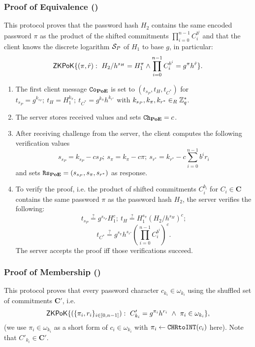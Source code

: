 \subsubsection{Proof of Equivalence (\PoE)}
This protocol proves that the password hash $H_2$ contains the same encoded password $\pi$ as the product of the shifted commitments $\prod_{i=0}^{n-1} C^{b^i}_i$ and that the client knows the discrete logarithm $\mathcal{S}_P$ of $H_1$ to base $g$, in particular:
\[
  \mathsf{ZKPoK}\{(\pi,\hat{r}) : ~ H_2/h^{s_H}=H_1^{\pi} \wedge \prod_{i=0}^{n-1} C_i^{b^i} = g^{\pi}h^{\hat{r}}\}.
\]
\begin{enumerate}
  \item The first client message $\mathtt{Co}_\mathsf{\bf PoE}$ is set to $(t_{s_P}, t_H, t_{C^\ast})$ for
    $t_{s_P}=g^{k_{s_P}};~ t_H=H_1^{k_{\pi}};~ t_{C^\ast}=g^{k_{\pi}}h^{k_{r^{\ast}}}$
    with 
    $k_{s_P},k_{\pi},k_{r^\ast}\in_R\mathbb{Z}^\ast_q$.
    
  \item The server stores received values and sets $\mathtt{Ch}_\mathsf{\bf PoE}=c$. 
  
  \item After receiving challenge \Client from the server, the client computes the following verification values
    \[
      s_{s_P}=k_{s_P}-c s_P;~ s_{\pi}=k_\pi - c \pi;~ s_{r^\ast}=k_{r^\ast} - c \sum_{i=0}^{n-1} b^i r_i
    \]
    and sets $\mathtt{Rs}_\mathsf{\bf PoE}=(s_{s_P}, s_\pi, s_{r^\ast})$ as response.
  
  \item To verify the proof, i.e. the product of shifted commitments $C_i^{b_i}$ for $C_i\in\bm C$ contains the same password $\pi$ as the password hash $H_2$, the server verifies the following:
    \[
      t_{s_P}\stackrel{?}{=}g^{s_{s_P}}H_1^{c};~ t_H\stackrel{?}{=}H_1^{s_\pi}(H_2/h^{s_H})^c;
    \]
    \[
      t_{C^\ast}\stackrel{?}{=}g^{s_\pi}h^{s_{r^\ast}} \left(\prod_{i=0}^{n-1} C^{b^i}_i \right)^c.
    \]
    The server accepts the proof iff those verifications succeed.
\end{enumerate}


\subsubsection{Proof of Membership (\PoM)}
This protocol proves that every password character $c_{k_i}\in\omega_{k_i}$ using the shuffled set of commitments $\bm C'$, i.e.
\[\mathsf{ZKPoK}\{(\{\pi_i,r_i\}_{i\in[0,n-1]}) : ~ C'_{{k_i}}=g^{\pi_{i}}h^{r_{i}} ~ \wedge ~ \pi_{i}\in \omega_{{k_i}}\},\]
(we use $\pi_{i}\in \omega_{{k_i}}$ as a short form of $c_i\in\omega_{{k_i}}$ with $\pi_i\gets \texttt{CHRtoINT}(c_i)$ here).
Note that $C'_{k_i}\in \bm C'$.


